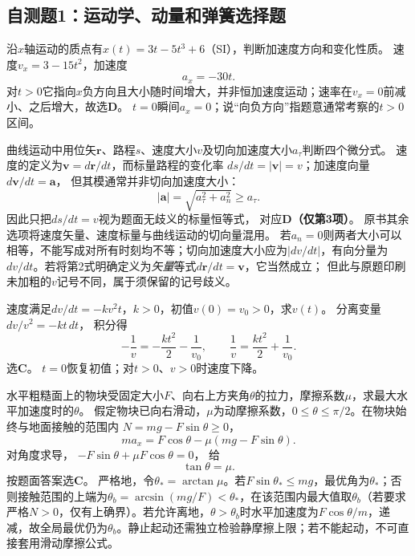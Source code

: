 
\subsection{自测题1：运动学、动量和弹簧选择题}

\problemtext 沿$x$轴运动的质点有$x(t)=3t-5t^3+6$（SI），判断加速度方向和变化性质。
\workings
速度$v_x=3-15t^2$，加速度
\[
\boxed{a_x=-30t}.
\]
对$t>0$它指向$x$负方向且大小随时间增大，并非恒加速度运动；速率在$v_x=0$前减小、之后增大，故选\textbf{D}。
\crosscheck $t=0$瞬间$a_x=0$；说“向负方向”指题意通常考察的$t>0$区间。

\problemtext 曲线运动中用位矢$\bm r$、路程$s$、速度大小$v$及切向加速度大小$a_\tau$判断四个微分式。
\workings
速度的定义为$\bm v=d\bm r/dt$，而标量路程的变化率
$ds/dt=|\bm v|=v$；加速度向量$d\bm v/dt=\bm a$，
但其模通常并非切向加速度大小：
\[
|\bm a|=\sqrt{a_\tau^2+a_n^2}\ge a_\tau.
\]
因此只把$ds/dt=v$视为题面无歧义的标量恒等式，
对应\textbf{D（仅第3项）}。
\crosscheck 原书其余选项将速度矢量、速度标量与曲线运动的切向量混用。
若$a_n=0$则两者大小可以相等，不能写成对所有时刻均不等；切向加速度大小应为$|dv/dt|$，有向分量为$dv/dt$。若将第2式明确定义为\emph{矢量}等式$d\bm r/dt=\bm v$，它当然成立；
但此与原题印刷未加粗的$v$记号不同，属于须保留的记号歧义。

\problemtext 速度满足$dv/dt=-kv^2t$，$k>0$，初值$v(0)=v_0>0$，求$v(t)$。
\workings
分离变量
$dv/v^2=-kt\,dt$，
积分得
\[
-\frac1v=-\frac{kt^2}{2}-\frac1{v_0},
\qquad
\boxed{\frac1v=\frac{kt^2}{2}+\frac1{v_0}}.
\]
选\textbf{C}。
\crosscheck $t=0$恢复初值；对$t>0$、$v>0$时速度下降。

\problemtext 水平粗糙面上的物块受固定大小$F$、向右上方夹角$\theta$的拉力，摩擦系数$\mu$，求最大水平加速度时的$\theta$。
\workings
假定物块已向右滑动，$\mu$为动摩擦系数，$0\le\theta\le\pi/2$。在物块始终与地面接触的范围内
$N=mg-F\sin\theta\ge0$，
\[
ma_x=F\cos\theta-\mu(mg-F\sin\theta).
\]
对角度求导，
$-F\sin\theta+\mu F\cos\theta=0$，
给
\[
\boxed{\tan\theta=\mu}.
\]
按题面答案选\textbf{C}。
\crosscheck 严格地，令$\theta_*=\arctan\mu$。若$F\sin\theta_*\le mg$，最优角为$\theta_*$；否则接触范围的上端为$\theta_b=\arcsin(mg/F)<\theta_*$，在该范围内最大值取$\theta_b$（若要求严格$N>0$，仅有上确界）。若允许离地，$\theta>\theta_b$时水平加速度为$F\cos\theta/m$，递减，故全局最优仍为$\theta_b$。静止起动还需独立检验静摩擦上限；若不能起动，不可直接套用滑动摩擦公式。

